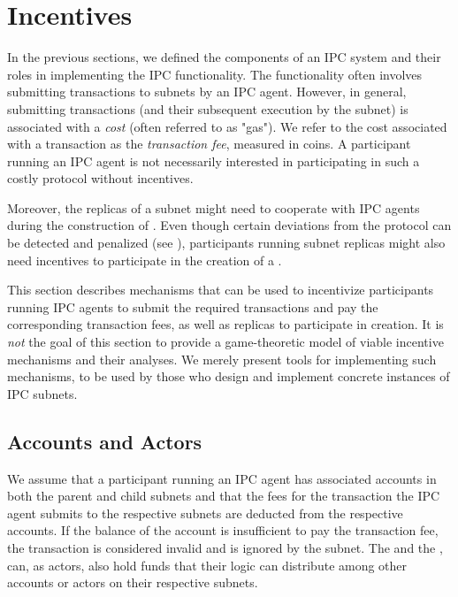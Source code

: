 \section{Incentives}
\label{sec:incentives}


In the previous sections, we defined the components of an IPC system and their roles in implementing the IPC functionality.
The functionality often involves submitting transactions to subnets by an IPC agent.
However, in general, submitting transactions (and their subsequent execution by the subnet) is associated with a \emph{cost} (often referred to as "gas").
We refer to the cost associated with a transaction as the \emph{transaction fee}, measured in coins.
A participant running an IPC agent is not necessarily interested in participating in such a costly protocol without incentives.

Moreover, the replicas of a subnet might need to cooperate with IPC agents during the construction of \pofsFull.
Even though certain deviations from the protocol can be detected and penalized (see ),
participants running subnet replicas might also need incentives to participate in the creation of a \pof.

This section describes mechanisms that can be used to incentivize participants running IPC agents
to submit the required transactions and pay the corresponding transaction fees,
as well as replicas to participate in \pof creation.
It is \emph{not} the goal of this section to provide a game-theoretic model of viable incentive mechanisms and their analyses.
We merely present tools for implementing such mechanisms, to be used by those who design and implement concrete instances of IPC subnets.


\subsection{Accounts and Actors}

We assume that a participant running an IPC agent has associated accounts in both the parent and child subnets and that the fees for the transaction the IPC agent submits to the respective subnets are deducted from the respective accounts.
If the balance of the account is insufficient to pay the transaction fee, the transaction is considered invalid and is ignored by the subnet.
The \sa and the \gw, can, as actors, also hold funds that their logic can distribute among other accounts or actors on their respective subnets.

